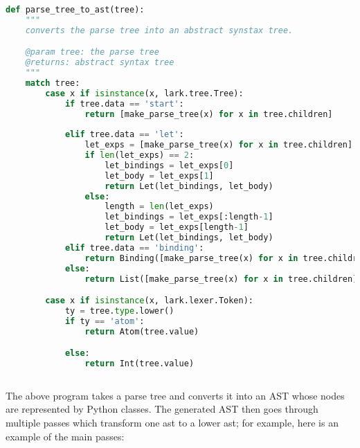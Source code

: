 \documentclass[10pt]{article}
\begin{document}
\begin{lstlisting}[language=python]
def parse_tree_to_ast(tree):
    """
    converts the parse tree into an abstract synstax tree.

    @param tree: the parse tree
    @returns: abstract syntax tree
    """
    match tree:
        case x if isinstance(x, lark.tree.Tree):
            if tree.data == 'start':
                return [make_parse_tree(x) for x in tree.children]
            
            elif tree.data == 'let':
                let_exps = [make_parse_tree(x) for x in tree.children]
                if len(let_exps) == 2:
                    let_bindings = let_exps[0]
                    let_body = let_exps[1]
                    return Let(let_bindings, let_body)
                else:
                    length = len(let_exps)
                    let_bindings = let_exps[:length-1]
                    let_body = let_exps[length-1]
                    return Let(let_bindings, let_body)
            elif tree.data == 'binding':
                return Binding([make_parse_tree(x) for x in tree.children])
            else:
                return List([make_parse_tree(x) for x in tree.children])

        case x if isinstance(x, lark.lexer.Token):
            ty = tree.type.lower()
            if ty == 'atom':
                return Atom(tree.value)

            else:
                return Int(tree.value)
    
\end{lstlisting}
The above program takes a parse tree and converts it into an AST whose nodes are represented by Python classes. The generated AST then goes through multiple passes which transform one ast to a lower ast; for example, here is an example of the main passes:
\end{document}
